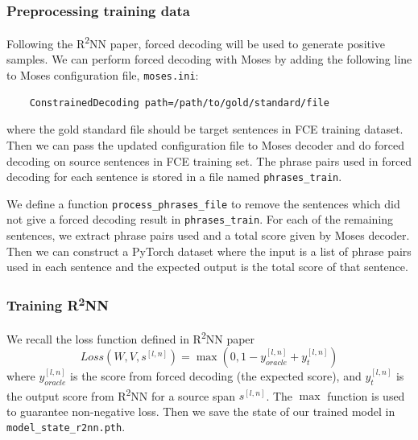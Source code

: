 \documentclass[12pt,a4paper,twoside,openright]{report}
\begin{document}
\subsubsection{Preprocessing training data}
Following the R\textsuperscript{2}NN paper\cite{r2nn}, forced decoding will be used to generate positive samples. We can perform forced decoding with Moses by adding the following line to Moses configuration file, \texttt{moses.ini}:
\begin{verbatim}
    ConstrainedDecoding path=/path/to/gold/standard/file
\end{verbatim}
where the gold standard file should be target sentences in FCE training dataset. Then we can pass the updated configuration file to Moses decoder and do forced decoding on source sentences in FCE training set. The phrase pairs used in forced decoding for each sentence is stored in a file named \texttt{phrases\_train}.

We define a function \texttt{process\_phrases\_file} to remove the sentences which did not give a forced decoding result in \texttt{phrases\_train}. For each of the remaining sentences, we extract phrase pairs used and a total score given by Moses decoder. Then we can construct a PyTorch dataset where the input is a list of phrase pairs used in each sentence and the expected output is the total score of that sentence.

\subsubsection{Training \texorpdfstring{R\textsuperscript{2}NN}{R2NN}}
We recall the loss function defined in R\textsuperscript{2}NN paper\cite{r2nn}
\[Loss(W,V,s^{[l,n]}) = \max{(0, 1-y_{oracle}^{[l,n]} + y_t^{[l,n]})} \]
where $y_{oracle}^{[l,n]}$ is the score from forced decoding (the expected score), and $y_t^{[l,n]}$ is the output score from R\textsuperscript{2}NN for a source span $s^{[l,n]}$. The $\max$ function is used to guarantee non-negative loss. Then we save the state of our trained model in \texttt{model\_state\_r2nn.pth}.
\end{document}
